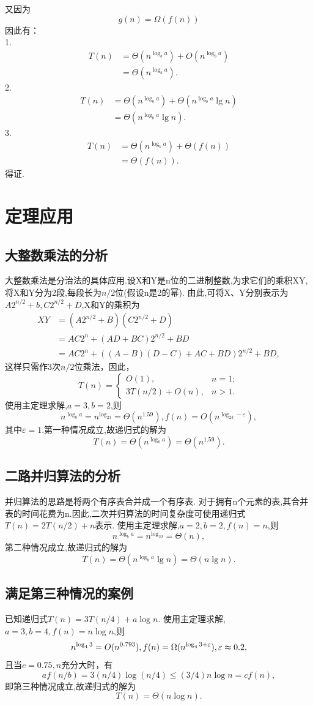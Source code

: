 \documentclass[a4paper]{article}%
\begin{document}
又因为\[g(n) =\Omega(f(n))\]
因此有：\\
1.\begin{align*}
T(n) &=\Theta(n^{\log_ba})+O(n^{\log_ba})\\
     &=\Theta(n^{\log_ba}).
\end{align*}
2.\begin{align*}
T(n) &=\Theta(n^{\log_ba})+\Theta(n^{\log_ba}\lg n)\\
     &=\Theta(n^{\log_ba}\lg n).
\end{align*}
3.\begin{align*}
T(n) &=\Theta(n^{\log_ba})+\Theta(f(n))\\
     &=\Theta(f(n)).
\end{align*}
得证.
\section{定理应用}
\subsection{大整数乘法的分析}
大整数乘法是分治法的具体应用.设X和Y是n位的二进制整数,为求它们的乘积XY,将X和Y分为2段,每段长为$n/2$位(假设n是2的幂).
由此,可将X、Y分别表示为$A2^{n/2}+b,C2^{n/2}+D$,X和Y的乘积为
\begin{align*}
XY &=(A2^{n/2}+B)(C2^{n/2}+D)\\
   &=AC2^n+(AD+BC)2^{n/2}+BD\\
   &=AC2^n+((A-B)(D-C)+AC+BD)2^{n/2}+BD,
\end{align*}
这样只需作3次$n/2$位乘法，因此，
\begin{equation*}\label{eq:dirichlet}
 T(n)=\begin{cases}
 O(1), &n=1;\\
  3T(n/2)+O(n), &n>1.
  \end{cases}
  \end{equation*}
使用主定理求解,$a=3,b=2$,则
\[n^{\log_ba}=n^{\log_23}=\Theta(n^{1.59}),f(n)=O(n^{\log_23-\varepsilon}),\]
其中$\varepsilon=1$.第一种情况成立,故递归式的解为
\[T(n)=\Theta(n^{\log_ba})=\Theta(n^{1.59}).\]
\subsection{二路并归算法的分析}
并归算法的思路是将两个有序表合并成一个有序表.
对于拥有n个元素的表,其合并表的时间花费为n.\cite{a}因此,二次并归算法的时间复杂度可使用递归式
$T(n)=2T(n/2)+n$表示.
使用主定理求解,$a=2,b=2,f(n)=n$,则
\[n^{\log_ba}=n^{\log_22}=\Theta(n),\]
第二种情况成立,故递归式的解为
\[T(n)=\Theta(n^{\log_ba}\lg n)=\Theta(n\lg n).\]
\subsection{满足第三种情况的案例}
已知递归式$T(n)=3T(n/4)+a\log n$.
使用主定理求解,$a=3,b=4,f(n)=n\log n$,则
\[n^{\log_43}=O(n^{0.793}),f(n)=\Omega(n^{\log_43+\varepsilon}),\varepsilon\thickapprox 0.2,\]
且当$c=0.75,n$充分大时，有
\[af(n/b)=3(n/4)\log (n/4)\le(3/4)n\log n=cf(n),\]
即第三种情况成立,故递归式的解为
\[T(n)=\Theta(n\log n).\]
\nocite{*}

\end{document}
